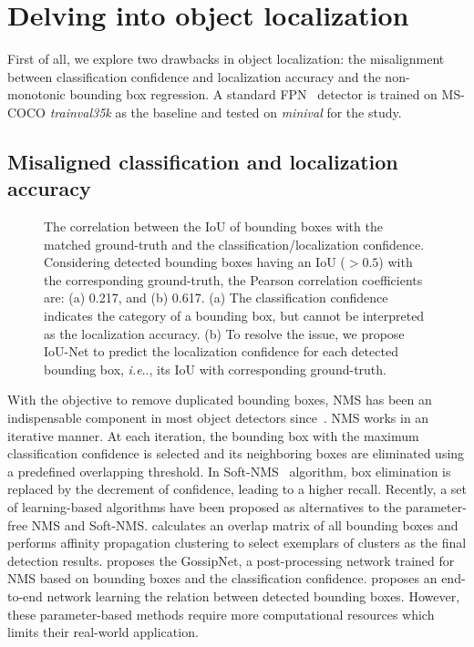 \documentclass[runningheads]{llncs}
\makeatletter
\DeclareRobustCommand\onedot{\futurelet\@let@token\@onedot}
\def\@onedot{\ifx\@let@token.\else.\null\fi\xspace}
\def\ie{\emph{i.e}\onedot} \def\Ie{\emph{I.e}\onedot}
\makeatother
\begin{document}
 \section{Delving into object localization}
\label{sec:delving}

First of all, we explore two drawbacks in object localization: the misalignment between classification confidence and localization accuracy and the non-monotonic bounding box regression. A standard FPN~\cite{Lin_2017_CVPR} detector is trained on MS-COCO \emph{trainval35k} as the baseline and tested on \emph{minival} for the study.

\subsection{Misaligned classification and localization accuracy}
\label{sec:problem:nms}
\begin{figure}[t]
\centering
{}
\caption{
The correlation between the IoU of bounding boxes with the matched ground-truth and the classification/localization confidence. Considering detected bounding boxes having an IoU ($> 0.5$) with the corresponding ground-truth, the Pearson correlation coefficients are: (a) 0.217, and (b) 0.617.\newline
(a) The classification confidence indicates the category of a bounding box, but cannot be interpreted as the localization accuracy.\newline
(b) To resolve the issue, we propose IoU-Net to predict the localization confidence for each detected bounding box, \ie, its IoU with corresponding ground-truth.
}
\label{fig:distribution}
\end{figure}

With the objective to remove duplicated bounding boxes, NMS has been an indispensable component in most object detectors since~\cite{dalal2005histograms}. NMS works in an iterative manner. At each iteration, the bounding box with the maximum classification confidence is selected and its neighboring boxes are eliminated using a predefined overlapping threshold. In Soft-NMS~\cite{bodla2017improving} algorithm, box elimination is replaced by the decrement of confidence, leading to a higher recall. Recently, a set of learning-based algorithms have been proposed as alternatives to the parameter-free NMS and Soft-NMS. \cite{rothe2014non} calculates an overlap matrix of all bounding boxes and performs affinity propagation clustering to select exemplars of clusters as the final detection results. \cite{hosang2017learning} proposes the GossipNet, a post-processing network trained for NMS based on bounding boxes and the classification confidence. \cite{hu2017relation} proposes an end-to-end network learning the relation between detected bounding boxes. However, these parameter-based methods require more computational resources which limits their real-world application.
\end{document}
